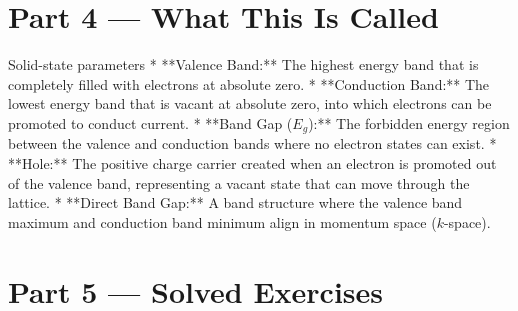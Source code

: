 \documentclass[12pt, a4paper]{book}
\begin{document}
\newpage

\section{Part 4 --- What This Is Called}

\begin{namedconcept}{Solid-state parameters}
* **Valence Band:** The highest energy band that is completely filled with electrons at absolute zero.
* **Conduction Band:** The lowest energy band that is vacant at absolute zero, into which electrons can be promoted to conduct current.
* **Band Gap ($E_g$):** The forbidden energy region between the valence and conduction bands where no electron states can exist.
* **Hole:** The positive charge carrier created when an electron is promoted out of the valence band, representing a vacant state that can move through the lattice.
* **Direct Band Gap:** A band structure where the valence band maximum and conduction band minimum align in momentum space ($k$-space).
\end{namedconcept}

\newpage

\section{Part 5 --- Solved Exercises}
\end{document}
